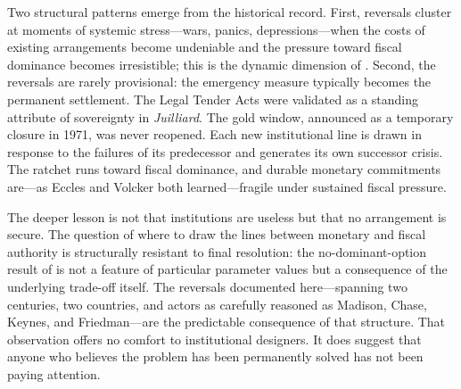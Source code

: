 \documentclass[12pt]{article}
\begin{document}
Two structural patterns emerge from the historical record.  First,
reversals cluster at moments of systemic stress---wars, panics,
depressions---when the costs of existing arrangements become undeniable
and the pressure toward fiscal dominance becomes irresistible; this is
the dynamic dimension of \citet{SargentWallace1981}.  Second, the
reversals are rarely provisional: the emergency measure typically becomes
the permanent settlement.  The Legal Tender Acts were validated as a
standing attribute of sovereignty in \textit{Juilliard}.  The gold
window, announced as a temporary closure in 1971, was never reopened.
Each new institutional line is drawn in response to the failures of its
predecessor and generates its own successor crisis.  The ratchet runs
toward fiscal dominance, and durable monetary commitments are---as Eccles
and Volcker both learned---fragile under sustained fiscal pressure.

The deeper lesson is not that institutions are useless but that no
arrangement is secure.  The question of where to draw the lines between
monetary and fiscal authority is structurally resistant to final
resolution: the no-dominant-option result of \citet{Sargent2011} is not
a feature of particular parameter values but a consequence of the
underlying trade-off itself.  The reversals documented here---spanning
two centuries, two countries, and actors as carefully reasoned as
Madison, Chase, Keynes, and Friedman---are the predictable consequence of
that structure.  That observation offers no comfort to institutional
designers.  It does suggest that anyone who believes the problem has been
permanently solved has not been paying attention.

\bigskip

%



\end{document}
